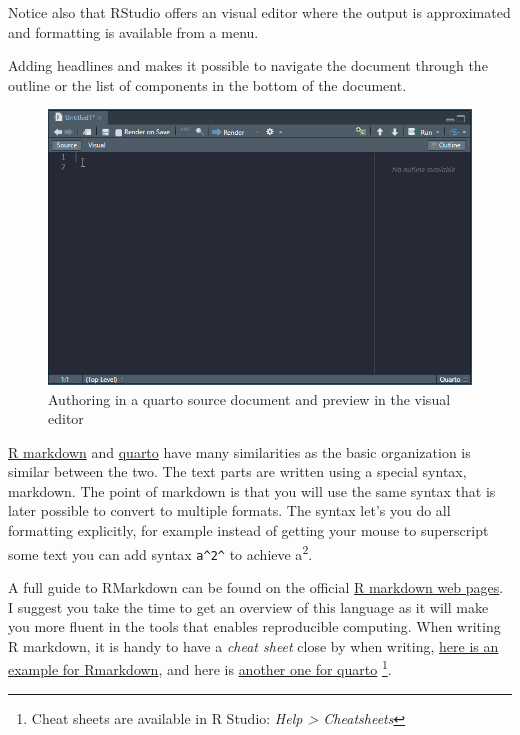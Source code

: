 \documentclass[
  11pt,
  letterpaper,
]{scrbook}
\begin{document}
Notice also that RStudio offers an visual editor where the output is
approximated and formatting is available from a menu.

Adding headlines and makes it possible to navigate the document through
the outline or the list of components in the bottom of the document.

\begin{figure}

{\centering \includegraphics{images/ch3/03-quartoauthor.gif}

}

\caption{Authoring in a quarto source document and preview in the visual
editor}

\end{figure}

\href{https://rmarkdown.rstudio.com/}{R markdown} and
\href{https://quarto.org/docs/guide/}{quarto} have many similarities as
the basic organization is similar between the two. The text parts are
written using a special syntax, markdown. The point of markdown is that
you will use the same syntax that is later possible to convert to
multiple formats. The syntax let's you do all formatting explicitly, for
example instead of getting your mouse to superscript some text you can
add syntax \texttt{a\^{}2\^{}} to achieve a\textsuperscript{2}.

A full guide to RMarkdown can be found on the official
\href{https://rmarkdown.rstudio.com/lesson-1.html}{R markdown web
pages}. I suggest you take the time to get an overview of this language
as it will make you more fluent in the tools that enables reproducible
computing. When writing R markdown, it is handy to have a \emph{cheat
sheet} close by when writing,
\href{https://www.rstudio.com/wp-content/uploads/2015/02/rmarkdown-cheatsheet.pdf}{here
is an example for Rmarkdown}, and here is
\href{https://rstudio.github.io/cheatsheets/html/quarto.html}{another
one for quarto} \footnote{Cheat sheets are available in R Studio:
  \emph{Help \textgreater{} Cheatsheets}}.
\end{document}
